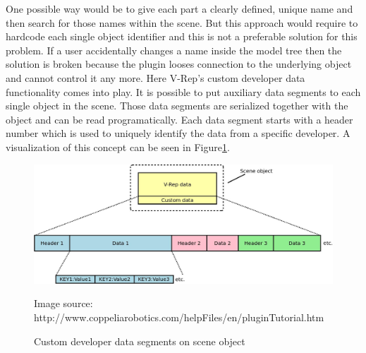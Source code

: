 One possible way would be to give each part a clearly defined, unique name and then search for those names within the scene. But this approach would require to hardcode each single object identifier and this is not a preferable solution for this problem. If a user accidentally changes a name inside the model tree then the solution is broken because the plugin looses connection to the underlying object and cannot control it any more. Here V-Rep's custom developer data functionality comes into play. It is possible to put auxiliary data segments to each single object in the scene. Those data segments are serialized together with the object and can be read programatically. Each data segment starts with a header number which is used to uniquely identify the data from a specific developer. A visualization of this concept can be seen in Figure\ref{fig:cust_dev_data}. 
\begin{figure}[h]
	\centering
  	\includegraphics[width=1.0\textwidth]{images/custom_dev_data.jpg}
	\caption{Custom developer data segments on scene object}
	{\scriptsize Image source: http://www.coppeliarobotics.com/helpFiles/en/pluginTutorial.htm}
	\label{fig:cust_dev_data}
\end{figure}

